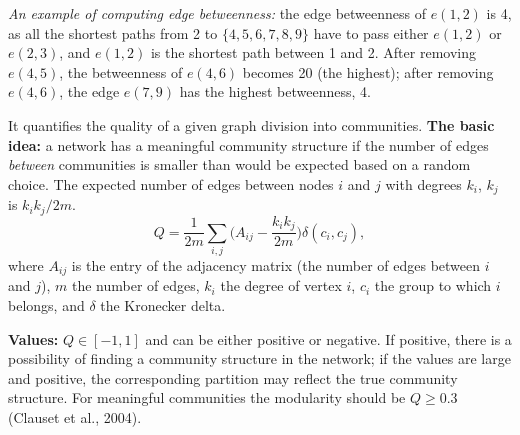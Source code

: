 \documentclass[11pt,a4paper]{article}
\theoremstyle{definition}
\begin{document}
\emph{An example of computing edge betweenness:} the edge betweenness of $e(1,2)$ is 4, as all the
shortest paths from 2 to $\{4,5,6,7,8,9\}$ have to pass either $e(1,2)$ or $e(2,3)$, and $e(1,2)$ is
the shortest path between 1 and 2. After removing $e(4,5)$, the betweenness of $e(4,6)$ becomes 20
(the highest); after removing $e(4,6)$, the edge $e(7,9)$ has the highest betweenness, 4.

\begin{defbox}[Modularity $Q$]
It quantifies the quality of a given graph division into communities. \textbf{The basic idea:} a
network has a meaningful community structure if the number of edges \emph{between} communities is
smaller than would be expected based on a random choice. The expected number of edges between nodes
$i$ and $j$ with degrees $k_i$, $k_j$ is $k_ik_j/2m$.
\[ Q=\frac{1}{2m}\sum_{i,j}\Big(A_{ij}-\frac{k_ik_j}{2m}\Big)\delta(c_i,c_j), \]
where $A_{ij}$ is the entry of the adjacency matrix (the number of edges between $i$ and $j$), $m$ the
number of edges, $k_i$ the degree of vertex $i$, $c_i$ the group to which $i$ belongs, and $\delta$
the Kronecker delta.

\textbf{Values:} $Q\in[-1,1]$ and can be either positive or negative. If positive, there is a
possibility of finding a community structure in the network; if the values are large and positive, the
corresponding partition may reflect the true community structure. For meaningful communities the
modularity should be $Q\ge 0.3$ (Clauset et al., 2004).
\end{defbox}
\end{document}
